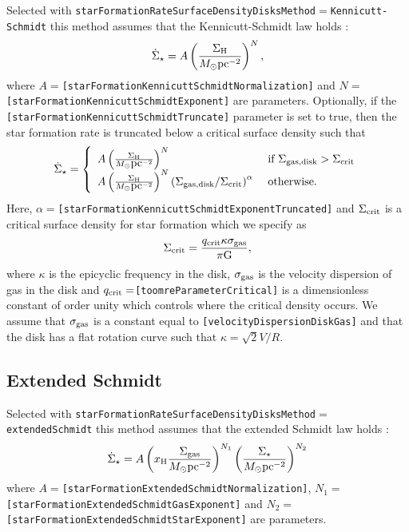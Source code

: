 Selected with {\tt starFormationRateSurfaceDensityDisksMethod}$=${\tt Kennicutt-Schmidt} this method assumes that the Kennicutt-Schmidt law holds \citep{schmidt_rate_1959,kennicutt_global_1998}:
\begin{equation}
\dot{\Sigma}_\star = A \left({\Sigma_{\rm H} \over M_\odot \hbox{pc}^{-2}} \right)^N,
\end{equation}
where $A=${\tt [starFormationKennicuttSchmidtNormalization]} and $N=${\tt [starFormationKennicuttSchmidtExponent]} are parameters. Optionally, if the {\tt [starFormationKennicuttSchmidtTruncate]} parameter is set to true, then the star formation rate is truncated below a critical surface density such that
\begin{equation}
\dot{\Sigma}_\star = \left\{ \begin{array}{ll} A \left({\Sigma_{\rm H} \over M_\odot \hbox{pc}^{-2}} \right)^N & \hbox{ if } \Sigma_{\rm gas,disk} > \Sigma_{\rm crit} \\ A \left({\Sigma_{\rm H} \over M_\odot \hbox{pc}^{-2}} \right)^N \left(\Sigma_{\rm gas,disk}/\Sigma_{\rm crit}\right)^\alpha & \hbox{ otherwise.} \end{array} \right.
\end{equation}
Here, $\alpha=${\tt [starFormationKennicuttSchmidtExponentTruncated]} and $\Sigma_{\rm crit}$ is a critical surface density for star formation which we specify as
\begin{equation}
\Sigma_{\rm crit} = {q_{\rm crit} \kappa \sigma_{\rm gas} \over \pi \G},
\end{equation}
where $\kappa$ is the epicyclic frequency in the disk, $\sigma_{\rm gas}$ is the velocity dispersion of gas in the disk and $q_{\rm crit}=${\tt [toomreParameterCritical]} is a dimensionless constant of order unity which controls where the critical density occurs. We assume that $\sigma_{\rm gas}$ is a constant equal to {\tt [velocityDispersionDiskGas]} and that the disk has a flat rotation curve such that $\kappa = \sqrt{2} V/R$.

\subsection{Extended Schmidt}\label{sec:StarFormationExtendedSchmidt}

Selected with {\tt starFormationRateSurfaceDensityDisksMethod}$=${\tt extendedSchmidt} this method assumes that the extended Schmidt law holds \citep{shi_extended_2011}:
\begin{equation}
\dot{\Sigma}_\star = A \left(x_{\rm H} {\Sigma_{\rm gas}\over M_\odot \hbox{pc}^{-2}}\right)^{N_1} \left({\Sigma_{\star}\over M_\odot \hbox{pc}^{-2}}\right)^{N_2}
\end{equation}
where $A=${\tt [starFormationExtendedSchmidtNormalization]}, $N_1=${\tt
[starFormationExtendedSchmidtGasExponent]} and $N_2=${\tt [starFormationExtendedSchmidtStarExponent]} are parameters.


